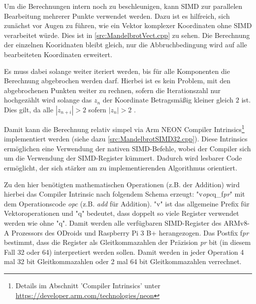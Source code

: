 Um die Berechnungen intern noch zu beschleunigen, kann SIMD zur parallelen Bearbeitung mehrerer Punkte verwendet werden.
Dazu ist es hilfreich, sich zunächst vor Augen zu führen, wie ein Vektor komplexer Koordinaten ohne SIMD verarbeitet würde.
Dies ist in \autoref{src:MandelbrotVect.cpp} zu sehen.
Die Berechnung der einzelnen Kooridnaten bleibt gleich, nur die Abbruchbedingung wird auf alle bearbeiteten Koordinaten erweitert.

Es muss dabei solange weiter iteriert werden, bis für alle Komponenten die Berechnung abgebrochen werden darf.
Hierbei ist es kein Problem, mit den abgebrochenen Punkten weiter zu rechnen, sofern die
Iterationszahl nur hochgezählt wird solange das $z_n$ der Koordinate Betragsmäßig kleiner gleich $2$ ist.
Dies gilt, da alle $|z_{n+i}| > 2$ sofern $|z_n| > 2$ \cite{424331}.

\begin{figure}
	
\end{figure}

Damit kann die Berechnung relativ simpel via Arm NEON Compiler Intrinsics\footnote{Details im Abschnitt 'Compiler Intrinsics' unter \url{https://developer.arm.com/technologies/neon}} implementiert werden (siehe dazu \autoref{src:MandelbrotSIMD32.cpp}).
Diese Intrinsics ermöglichen eine Verwendung der nativen SIMD-Befehle, wobei der Compiler sich um die Verwendung der SIMD-Register kümmert.
Dadurch wird lesbarer Code ermöglicht, der sich stärker am zu implementierenden Algorithmus orientiert.

Zu den hier benötigten mathematischen Operationen (z.B. der Addition) wird hierbei das Compiler Intrinsic nach folgendem Schema erzeugt:
"v\textit{opc}q\_f\textit{pr}" mit dem Operationscode \textit{opc} (z.B. \textit{add} für Addition).
"v" ist das allgemeine Prefix für Vektoroperationen und "q" bedeutet, dass doppelt so viele Register verwendet werden wie ohne "q".
Damit werden alle verfügbaren SIMD-Register des ARMv8-A Prozessors des ODroids und Raspberry Pi 3 B+ herangezogen.
Das Postfix f\textit{pr} bestimmt, dass die Register als Gleitkommazahlen der Präzision \textit{pr} bit (in diesem Fall 32 oder 64) interpretiert werden sollen.
Damit werden in jeder Operation 4 mal 32 bit Gleitkommazahlen oder 2 mal 64 bit Gleitkommazahlen verrechnet.

